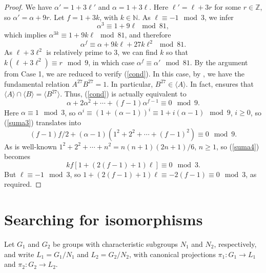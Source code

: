 \documentclass{amsart}
\newtheorem{cor}[theorem]{Corollary}
\theoremstyle{definition}
\theoremstyle{remark}
\newcommand \Z{{\mathbb Z}}
\newcommand \N{{\mathbb N}}
\begin{document}
\begin{proof}
We have $\alpha'=1+3\ell'$ and $\alpha=1+3\ell$. Here $\ell'=\ell+3r$ for some $r\in\Z$, so
$\alpha'=\alpha+9r$. Let $f=1+3k$, with $k\in\N$. As $\ell\equiv -1\mod 3$, we infer
$$
\alpha^3\equiv 1+9\ell\mod 81,
$$
which implies $\alpha^{3k}\equiv 1+9k\ell\mod 81$, and therefore
$$
\alpha^{f}\equiv\alpha+9k\ell+27k\ell^2\mod 81.
$$
As $\ell+3\ell^2$ is relatively prime to 3, we can find $k$ so that $k(\ell+3\ell^2)\equiv r\mod 9$,
in which case $\alpha^f\equiv\alpha'\mod 81$.
By the argument from Case 1, we are reduced to verify (\ref{cond}). In this case, by \cite[Section 6]{MS}, we have the fundamental relation
$A^{27}B^{27}=1$.
In particular, $B^{27}\in \langle A\rangle$. In fact, \cite[Proposition 7.2]{MS} ensures that
$\langle A\rangle\cap \langle B\rangle= \langle B^{27} \rangle$. Thus, (\ref{cond})
is actually equivalent to
\begin{equation}
\label{suma3}
\alpha+2\alpha^2+\cdots+(f-1)\alpha^{f-1}\equiv 0\mod 9.
\end{equation}
Here $\alpha\equiv 1\mod 3$, so $\alpha^i\equiv (1+(\alpha-1))^i\equiv 1+i(\alpha-1)\mod 9$, $i\geq 0$,
so (\ref{suma3}) translates into
\begin{equation}
\label{suma4}
(f-1)f/2+(\alpha-1)(1^2+2^2+\cdots+(f-1)^2)\equiv 0\mod 9.
\end{equation}
As is well-known $1^2+2^2+\cdots+n^2=n(n+1)(2n+1)/6$, $n\geq 1$,
so (\ref{suma4}) becomes
\begin{equation}
\label{suma5}
kf[1+(2(f-1)+1)\ell]\equiv 0\mod 3.
\end{equation}
But $\ell\equiv -1\mod 3$, so $1+(2(f-1)+1)\ell\equiv -2(f-1)\equiv 0\mod 3$, as required.
\end{proof}


\section{Searching for isomorphisms}\label{si}

Let $G_1$ and $G_2$ be groups with characteristic subgroups $N_1$ and $N_2$, respectively,
and write $L_1=G_1/N_1$ and $L_2=G_2/N_2$, with canonical projections $\pi_1:G_1\to L_1$
and $\pi_2:G_2\to L_2$.
\end{document}
